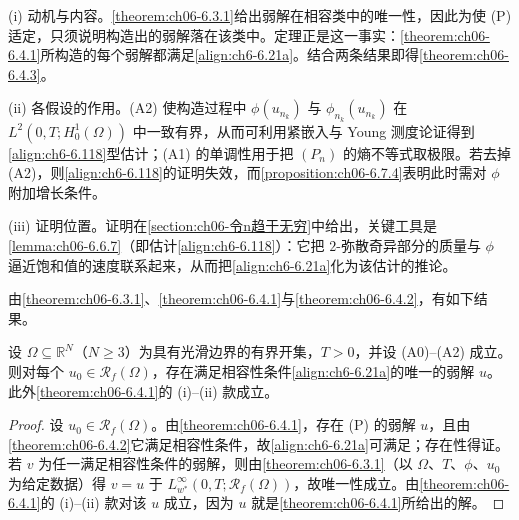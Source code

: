 \documentclass[../../main.tex]{subfiles}%
\begin{document}
\begin{remark}\label{remark:ch06-相容存在}
(i) 动机与内容。\cref{theorem:ch06-6.3.1}给出弱解在相容类中的唯一性，因此为使 (P) 适定，只须说明构造出的弱解落在该类中。定理正是这一事实：\cref{theorem:ch06-6.4.1}所构造的每个弱解都满足\eqref{align:ch6-6.21a}。结合两条结果即得\cref{theorem:ch06-6.4.3}。

(ii) 各假设的作用。(A2) 使构造过程中 $\phi(u_{n_k})$ 与 $\phi_{n_k}(u_{n_k})$ 在 $L^2(0,T;H^1_0(\Omega))$ 中一致有界，从而可利用紧嵌入与 Young 测度论证得到\eqref{align:ch6-6.118}型估计；(A1) 的单调性用于把 $(P_n)$ 的熵不等式取极限。若去掉 (A2)，则\eqref{align:ch6-6.118}的证明失效，而\cref{proposition:ch06-6.7.4}表明此时需对 $\phi$ 附加增长条件。

(iii) 证明位置。证明在\cref{section:ch06-令n趋于无穷}中给出，关键工具是\cref{lemma:ch06-6.6.7}（即估计\eqref{align:ch6-6.118}）：它把 $2$-弥散奇异部分的质量与 $\phi$ 逼近饱和值的速度联系起来，从而把\eqref{align:ch6-6.21a}化为该估计的推论。
\end{remark}

由\cref{theorem:ch06-6.3.1}、\cref{theorem:ch06-6.4.1}与\cref{theorem:ch06-6.4.2}，有如下结果。

\begin{theorem}\label{theorem:ch06-6.4.3}
设 $\Omega\subseteq\mathbb{R}^N$（$N\geqslant3$）为具有光滑边界的有界开集，$T>0$，并设 (A0)--(A2) 成立。则对每个 $u_0\in\mathscr{R}_f(\Omega)$，存在满足相容性条件\eqref{align:ch6-6.21a}的唯一的弱解 $u$。此外\cref{theorem:ch06-6.4.1}的 (i)--(ii) 款成立。
\end{theorem}

\begin{proof}
设 $u_0\in\mathscr{R}_f(\Omega)$。由\cref{theorem:ch06-6.4.1}，存在 (P) 的弱解 $u$，且由\cref{theorem:ch06-6.4.2}它满足相容性条件，故\eqref{align:ch6-6.21a}可满足；存在性得证。若 $v$ 为任一满足相容性条件的弱解，则由\cref{theorem:ch06-6.3.1}（以 $\Omega$、$T$、$\phi$、$u_0$ 为给定数据）得 $v=u$ 于 $L^\infty_{w^*}(0,T;\mathscr{R}_f(\Omega))$，故唯一性成立。由\cref{theorem:ch06-6.4.1}的 (i)--(ii) 款对该 $u$ 成立，因为 $u$ 就是\cref{theorem:ch06-6.4.1}所给出的解。
\end{proof}
\end{document}
